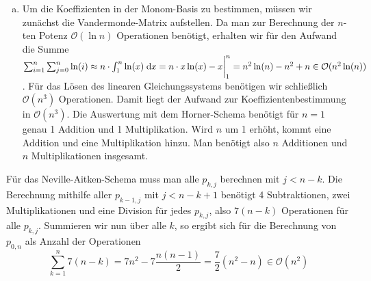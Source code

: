 \documentclass{article}
\theoremstyle{definition}
\begin{document}
\begin{enumerate}[(a)]
    \item Um die Koeffizienten in der Monom-Basis zu bestimmen, müssen wir zunächst die Vandermonde-Matrix aufstellen. Da man zur Berechnung der $n$-ten Potenz $\mathcal{O}(\ln n)$ Operationen benötigt, erhalten wir für den Aufwand die Summe $\sum_{i = 1}^{n} \sum_{j = 0}^{n}\ln(i) \approx n\cdot \int_1^n\ln(x) \;\mathrm{d} x = n\cdot x\ln(x) -x \bigg|_1^n = n^2\ln(n) - n^2 + n \in \mathcal{O}(n^2\ln(n))$. Für das Lösen des linearen Gleichungssystems benötigen wir schließlich $\mathcal{O}(n^3)$ Operationen. Damit liegt der Aufwand zur Koeffizientenbestimmung in $\mathcal{O}(n^3)$. Die Auswertung mit dem Horner-Schema benötigt für $n=1$ genau 1 Addition und 1 Multiplikation. Wird $n$ um 1 erhöht, kommt eine Addition und eine Multiplikation hinzu. Man benötigt also $n$ Additionen und $n$ Multiplikationen insgesamt.
\end{enumerate}
Für das Neville-Aitken-Schema muss man alle $p_{k,j}$ berechnen mit $j <n-k$. Die Berechnung mithilfe aller $p_{k-1,j}$ mit $j<n-k+1$ benötigt 4 Subtraktionen, zwei Multiplikationen und eine Division für jedes $p_{k,j}$, also $7(n-k)$ Operationen für alle $p_{k,j}$. Summieren wir nun über alle $k$, so ergibt sich für die Berechnung von $p_{0,n}$ als Anzahl der Operationen
\[
    \sum_{k = 1}^{n}7(n-k) = 7n^2 - 7\frac{n(n-1)}{2} = \frac{7}{2}\left(n^2-n\right) \in \mathcal{O}(n^2)
\]
\end{document}
